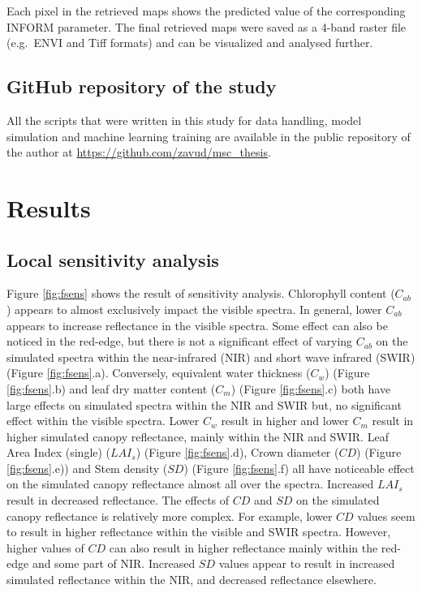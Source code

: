 \documentclass[a4paper, twoside]{templates/ociamthesis}
\begin{document}
Each pixel in the retrieved maps shows the predicted value of the corresponding INFORM parameter. The final retrieved maps were saved as a 4-band raster file (e.g.~ENVI and Tiff formats) and can be visualized and analysed further.

\hypertarget{github-repository-of-the-study}{%
\section{GitHub repository of the study}\label{github-repository-of-the-study}}

All the scripts that were written in this study for data handling, model simulation and machine learning training are available in the public repository of the author at \url{https://github.com/zavud/msc_thesis}.

\hypertarget{results}{%
\chapter{Results}\label{results}}

\hypertarget{local-sensitivity-analysis-1}{%
\section{Local sensitivity analysis}\label{local-sensitivity-analysis-1}}

Figure \ref{fig:fsens} shows the result of sensitivity analysis. Chlorophyll content (\(C_{ab}\)) appears to almost exclusively impact the visible spectra. In general, lower \(C_{ab}\) appears to increase reflectance in the visible spectra. Some effect can also be noticed in the red-edge, but there is not a significant effect of varying \(C_{ab}\) on the simulated spectra within the near-infrared (NIR) and short wave infrared (SWIR) (Figure \ref{fig:fsens}.a). Conversely, equivalent water thickness (\(C_{w}\)) (Figure \ref{fig:fsens}.b) and leaf dry matter content (\(C_{m}\)) (Figure \ref{fig:fsens}.c) both have large effects on simulated spectra within the NIR and SWIR but, no significant effect within the visible spectra. Lower \(C_{w}\) result in higher and lower \(C_{m}\) result in higher simulated canopy reflectance, mainly within the NIR and SWIR. Leaf Area Index (single) (\(LAI_{s}\)) (Figure \ref{fig:fsens}.d), Crown diameter (\(CD\)) (Figure \ref{fig:fsens}.e)) and Stem density (\(SD\)) (Figure \ref{fig:fsens}.f) all have noticeable effect on the simulated canopy reflectance almost all over the spectra. Increased \(LAI_{s}\) result in decreased reflectance. The effects of \(CD\) and \(SD\) on the simulated canopy reflectance is relatively more complex. For example, lower \(CD\) values seem to result in higher reflectance within the visible and SWIR spectra. However, higher values of \(CD\) can also result in higher reflectance mainly within the red-edge and some part of NIR. Increased \(SD\) values appear to result in increased simulated reflectance within the NIR, and decreased reflectance elsewhere.
\end{document}
